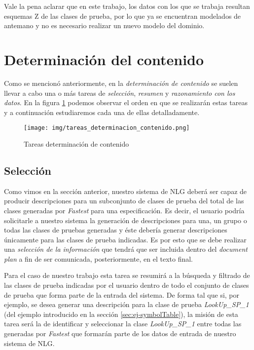 Vale la pena aclarar que en este trabajo, los datos con los que se trabaja resultan esquemas Z de las clases de prueba, por lo que ya se encuentran modelados de antemano y no es necesario realizar un nuevo modelo del dominio.
 

\section{Determinación del contenido}
\label{cap:determinacion_contenido}

Como se mencionó anteriormente, en la \emph{determinación de contenido} se suelen llevar a cabo una o más tareas de \emph{selección}, \emph{resumen} y \emph{razonamiento con los datos}. En la figura \ref{fig:tareas_determinacion_contenido} podemos observar el orden en que se realizarán estas tareas y a continuación estudiaremos cada una de ellas detalladamente.

\begin{figure}[H]
  	\centering
	\texttt{[image: img/tareas\_determinacion\_contenido.png]}
	\caption{Tareas determinación de contenido}
  	\label{fig:tareas_determinacion_contenido}
\end{figure}

\subsection*{Selección}
Como vimos en la sección anterior, nuestro sistema de NLG deberá ser capaz de producir descripciones para un subconjunto de clases de prueba del total de las clases generadas por \emph{Fastest} para una especificación. Es decir, el usuario podría solicitarle a nuestro sistema la generación de descripciones para una, un grupo o todas las clases de pruebas generadas y éste debería generar descripciones únicamente para las clases de prueba indicadas. Es por esto que se debe realizar una \emph{selección de la información} que tendrá que ser incluida dentro del \textit{document plan} a fin de ser comunicada, posteriormente, en el texto final.

Para el caso de nuestro trabajo esta tarea se resumirá a la búsqueda y filtrado de las clases de prueba indicadas por el usuario dentro de todo el conjunto de clases de prueba que forma parte de la entrada del sistema. De forma tal que si, por ejemplo, se desea generar una descripción para la clase de prueba \emph{LookUp\_SP\_1} (del ejemplo introducido en la sección \ref{sec:ej-symbolTable}), la misión de esta tarea será la de identificar y seleccionar la clase \emph{LookUp\_SP\_1} entre todas las generadas por \emph{Fastest} que formarán parte de los datos de entrada de nuestro sistema de NLG.

